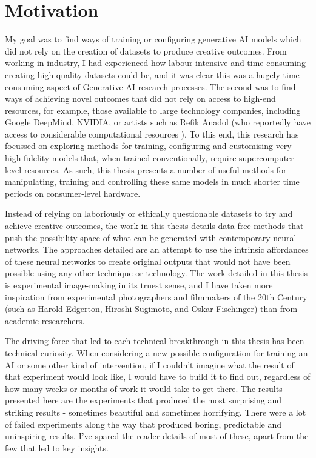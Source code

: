 \section{Motivation}

My goal was to find ways of training or configuring generative AI models which did not rely on the creation of datasets to produce creative outcomes. 
From working in industry, I had experienced how labour-intensive and time-consuming creating high-quality datasets could be, and it was clear this was a hugely time-consuming aspect of Generative AI research processes.
The second was to find ways of achieving novel outcomes that did not rely on access to high-end resources, for example, those available to large technology companies, including Google DeepMind, NVIDIA, or artists such as Refik Anadol (who reportedly have access to considerable computational resources  \citep{caulfield2022refik}). 
To this end, this research has focussed on exploring methods for training, configuring and customising very high-fidelity models that, when trained conventionally, require supercomputer-level resources. 
As such, this thesis presents a number of useful methods for manipulating, training and controlling these same models in much shorter time periods on consumer-level hardware.

Instead of relying on laboriously or ethically questionable datasets to try and achieve creative outcomes, the work in this thesis details data-free methods that push the possibility space of what can be generated with contemporary neural networks.
The approaches detailed are an attempt to use the intrinsic affordances of these neural networks to create original outputs that would not have been possible using any other technique or technology. 
The work detailed in this thesis is experimental image-making in its truest sense, and I have taken more inspiration from experimental photographers and filmmakers of the 20th Century (such as Harold Edgerton, Hiroshi Sugimoto, and Oskar Fischinger) than from academic researchers.

The driving force that led to each technical breakthrough in this thesis has been technical curiosity. 
When considering a new possible configuration for training an AI or some other kind of intervention, if I couldn’t imagine what the result of that experiment would look like, I would have to build it to find out, regardless of how many weeks or months of work it would take to get there. 
The results presented here are the experiments that produced the most surprising and striking results - sometimes beautiful and sometimes horrifying. 
There were a lot of failed experiments along the way that produced boring, predictable and uninspiring results. 
I’ve spared the reader details of most of these, apart from the few that led to key insights.

